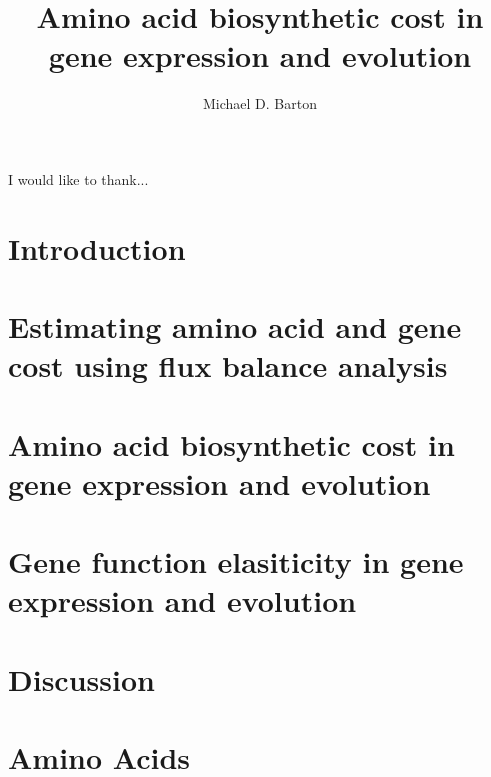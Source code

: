\documentclass[12pt,PhD]{muthesis}
\begin{document}
\title{Amino acid biosynthetic cost in gene expression and evolution}
\author{Michael D. Barton}

\beforeabstract

\printnomenclature[3cm]


\afterabstract

I would like to thank...
\afterpreface

\chapter{Introduction}

\chapter{Estimating amino acid and gene cost using flux balance analysis}

\chapter{Amino acid biosynthetic cost in gene expression and evolution}

\chapter{Gene function elasiticity in gene expression and evolution}

\chapter{Discussion}





\appendix
\addappheadtotoc
\appendixpage
\chapter{Amino Acids}

\end{document}
